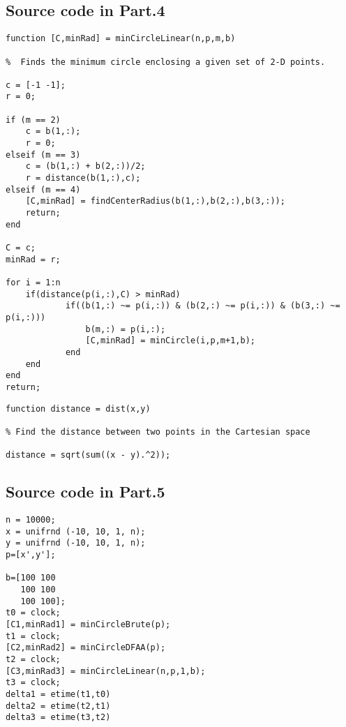 \documentclass[a4paper, 12pt]{article}
\begin{document}
\newpage
\subsection{Source code in Part.4}
%
\begin{lstlisting}
function [C,minRad] = minCircleLinear(n,p,m,b)

%  Finds the minimum circle enclosing a given set of 2-D points.

c = [-1 -1];
r = 0;

if (m == 2)
    c = b(1,:);
    r = 0;
elseif (m == 3)
    c = (b(1,:) + b(2,:))/2;
    r = distance(b(1,:),c);
elseif (m == 4)
    [C,minRad] = findCenterRadius(b(1,:),b(2,:),b(3,:));
    return;
end

C = c;
minRad = r;

for i = 1:n
    if(distance(p(i,:),C) > minRad)
            if((b(1,:) ~= p(i,:)) & (b(2,:) ~= p(i,:)) & (b(3,:) ~= p(i,:)))
                b(m,:) = p(i,:);
                [C,minRad] = minCircle(i,p,m+1,b);
            end
    end
end
return;
\end{lstlisting}

\begin{lstlisting}
function distance = dist(x,y)

% Find the distance between two points in the Cartesian space

distance = sqrt(sum((x - y).^2));
\end{lstlisting}

\subsection{Source code in Part.5}

\begin{lstlisting}
n = 10000;
x = unifrnd (-10, 10, 1, n);
y = unifrnd (-10, 10, 1, n);
p=[x',y'];

b=[100 100
   100 100
   100 100];
t0 = clock;
[C1,minRad1] = minCircleBrute(p);
t1 = clock;
[C2,minRad2] = minCircleDFAA(p);
t2 = clock;
[C3,minRad3] = minCircleLinear(n,p,1,b);
t3 = clock;
delta1 = etime(t1,t0)
delta2 = etime(t2,t1)
delta3 = etime(t3,t2)
\end{lstlisting}
\end{document}
